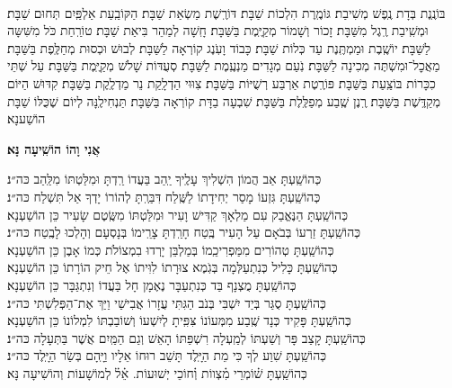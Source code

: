 \documentclass[twoside, openany, parskip=half, 11pt]{book}
\begin{document}
\sepline

\\
בּוֹנֶֽנֶת בְּדָת נֶֽפֶשׁ מְשִׁיבַת׃ גּוֹמֶֽרֶת הִלְכוֹת שַׁבָּת׃ דּוֹרֶֽשֶׁת מַשְׂאַת שַׁבָּת׃ הַקּוֹבַֽעַת אַלְפַּֽיִם תְּחוּם שַׁבָּת׃ וּמְשִֽׁיבַת רֶֽגֶל מִשַּׁבָּת׃ זָכוֹר וְשָׁמוֹר מְקַיֶּֽמֶת בַּשַּׁבָּת׃ חָֽשָׁה לְמַהֵר בִּיאַת שַׁבָּת׃ טוֹרַֽחַת כֹּל מִשִּׁשָּה לַשַּׁבָּת׃ יוֹשֶֽׁבֶת וּמַמְתֶּֽנֶת עַד כְּלוֹת שַׁבָּת׃ כָּבוֹד וָעֹֽנֶג קוֹרְאָה לַשַּׁבָּת׃ לְבוּשׁ וּכְסוּת מְחַלֶּֽפֶת בַּשַּׁבָּת׃ מַאֲכׇל־וּמִשְׁתֶּה מְכִינָה לַשַּׁבָּת׃ נֹֽעַם מְגָדִים מַנְעֶֽמֶת לַשַּׁבָּת׃ סְעֻדּוֹת שָׁלֹשׁ מְקַיֶּֽמֶת בַּשַּׁבָּת׃ עַל שְׁתֵּי כִכָּרוֹת בּוֹצַֽעַת בַּשַּׁבָּת׃ פּוֹרֶֽטֶת אַרְבַּע רְשֻׁיּוֹת בַּשַּׁבָּת׃ צִוּוּי הַדְלָֽקַת נֵר מַדְלֶֽקֶת בַּשַּׁבָּת׃ קִדּוּשׁ הַיּוֹם מְקַדֶּֽשֶׁת בַּשַּׁבָּת׃ רֶֽנֶן שֶֽׁבַע מְפַלֶּֽלֶת בַּשַּׁבָּת׃ שִׁבְעָה בַדָּת קוֹרְאָה בַּשַּׁבָּת׃ תַּנְחִילֶֽנָּה לְיוֹם שֶׁכֻּלּוֹ שַׁבָּת הוֹשַׁענָא׃

\begin{large}
\textbf{אֲנִי וָהוֹ הוֹשִֽׁיעָה נָּא׃}
\end{large}

\begin{small}
כְּהוֹשַֽׁעְתָּ אַב הֲמוֹן הִשְׁלִיךְ עָלֶֽיךָ יַֽהַב בַּעֲדוֹ רַֽדְתָּ וּמִלַּטְתּוֹ מִלַּֽהַב \hfill כּה״נ׃\\
כְּהוֹשַֽׁעְתָּ גִּזְעוֹ מָסַר יְחִידָתוֹ לַשֶּֽׁלַח דִּבַּרְֽתָּ לְהוֹרוֹ יָדְךָ אַל תִּשְׁלַח \hfill כּה״נ׃ \\
כְּהוֹשַֽׁעְתָּ הַנֶּאֱבַק עִם מַלְאָךְ קַדִּישׁ וָעִיר וּמִלַּטְתּוֹ מִשֶּֽׂטֶם שָׂעִיר \hfill כֵּן הוֹשַׁעְנָא׃ \\
כְּהוֹשַֽׁעְתָּ זַרְעוֹ בְּבֹאָם עַל הָעִיר בֶּֽטַח חָרַֽדְתָּ צָרֵֽימוֹ בְּנָסְעָם וְהָלְכוּ לָבֶֽטַח \hfill כּה״נ׃ \\
כְּהוֹשַֽׁעְתָּ טְהוֹרִים מִמַּפְרִיכֵֽמוֹ בְּמַלְבֵּן יָרְדוּ בִמְצוֹלֹת כְּמוֹ אָבֶן \hfill כֵּן הוֹשַׁעְנָא׃ \\
כְּהוֹשַֽׁעְתָּ כָּלִיל כְּנִתְעַלְּמָה בְּגֹֽמֶא צוּרָתוֹ לִוִּיתוֹ אֶל חֵיק הוֹרָתוֹ \hfill כֵּן הוֹשַׁעְנָא׃ \\
כְּהוֹשַֽׁעְתָּ מֻצְנָף בַּד כְּנִתְעַבָּר נֶאֶמָן חָל בַּעֲדוֹ וְנִתְגַּבָּר \hfill כֵּן הוֹשַׁעְנָא׃ \\
כְּהוֹשַֽׁעְתָּ סֻגַּר בְּיַד יִשְׁבִּי בְּנֹב הַגִּתִּי עֲזָרוֹ אֲבִישַׁי וַיַּךְ אֶת־הַפְּלִשְׁתִּי \hfill כּה״נ׃\\
כְּהוֹשַֽׁעְתָּ פָּקִיד כְּנָד שֶֽׁבַע מִמְּעוֹנוֹ צִּפִּֽיתָ לְיִשְׁעוֹ וְשׁוֹבַבְתּוֹ לִמְלוֹנוֹ \hfill כֵּן הוֹשַׁעְנָא׃\\
כְּהוֹשַֽׁעְתָּ קָצַב פָּר וְשַׁעְתּוֹ לְמַֽעְלָה רִשְׁפַּתּוֹ הָאֵשׁ וְגַם הַמַּֽיִם אֲשֶׁר בַּתְּעָלָה \hfill כּה״נ׃\\
כְּהוֹשַֽׁעְתָּ שִׁוַע לְךָ כִּי מֵת הַיָּֽלֶד תָּשֵׁב רוּחוֹ אֵלָיו וַיָּֽהָם בְּשַׂר הַיָּֽלֶד \hfill כּה״נ׃\\
כְּהוֹשַֽׁעְתָּ שׁ֗וֹמְרֵי מִ֗צְווֹת וְ֗חוֹכֵי יְשׁוּעוֹת. אֵ֗ל֗ לְמוֹשָׁעוֹת \hfill וְהוֹשִׁיעָה נָּא׃\\

\end{small}
\end{document}
